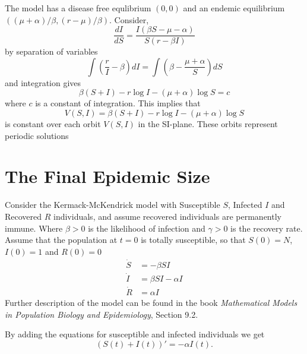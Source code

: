 \documentclass{book}\usepackage[]{graphicx}\usepackage[]{color}
\begin{document}
The model has a disease free equlibrium $(0,0)$ and an endemic equilibrium $((\mu+\alpha) / \beta,(r-\mu) / \beta)$. Consider, 
\begin{equation}
\frac{d I}{d S}=\frac{I(\beta S-\mu-\alpha)}{S(r-\beta I)}
\end{equation}
by separation of variables
\begin{equation}
\int\left(\frac{r}{I}-\beta\right) d I=\int\left(\beta-\frac{\mu+\alpha}{S}\right) d S
\end{equation}
and integration gives
\begin{equation}
\beta(S+I)-r \log I-(\mu+\alpha) \log S=c
\end{equation}
where $c$ is a constant of integration. This implies that
\begin{equation}
V(S,I)=\beta(S+I)-r \log I-(\mu+\alpha) \log S
\end{equation}
is constant over each orbit $V(S,I)$ in the SI-plane. These orbits represent periodic solutions


    

\chapter{The Final Epidemic Size}
\label{chapt:finsize}

Consider the Kermack-McKendrick model with Susceptible $S$, Infected $I$ and Recovered $R$ individuals, and assume recovered individuals are permanently immune. Where $\beta>0$ is the likelihood of infection and $\gamma>0$ is the recovery rate.
Assume that the population at $t=0$ is totally susceptible, so that $S(0)=N$, $I(0)=1$ and $R(0)=0$
\begin{align*}
\dot{S} &= -\beta S I\\
 \dot{I} &= \beta S I -\alpha I\\
 \dot{R} &= \alpha I
\end{align*}
%
Further description of the model can be found in the book {\it Mathematical Models in Population Biology and Epidemiology}, Section 9.2.

By adding the equations for susceptible and infected individuals we get
\begin{equation} \label{eq:fun1}
(S(t)+I(t))'=-\alpha I(t).
\end{equation}
\end{document}

